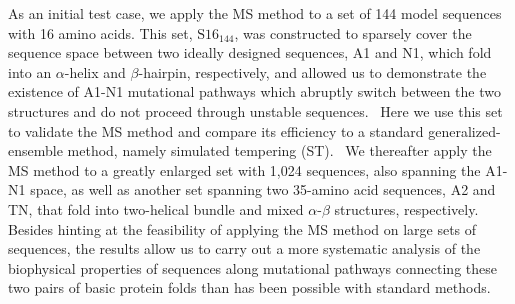 \documentclass[
aip,
rsi,%
amsmath,amssymb,
reprint,%
]{revtex4-1}
\newcommand {\SR}		{${\mathrm{S16}_{144}}$}
\begin{document}
As an initial test case, we apply the MS method to a set of 144 model sequences with 16 amino acids. This set, {\SR}, was constructed to sparsely cover the sequence space between two ideally designed sequences, A1 and N1, which fold into an $\alpha$-helix and $\beta$-hairpin, respectively, and allowed us to demonstrate the existence of A1-N1 mutational pathways which abruptly switch between the two structures and do not proceed through unstable sequences.~\cite{Holzgrafe2014} Here we use this set to validate the MS method and compare its efficiency to a standard generalized-ensemble method, namely simulated tempering (ST).~\cite{Marinari1992,Lyubartsev1992} We thereafter apply the MS method to a greatly enlarged set with 1,024 sequences, also spanning the A1-N1 space, as well as another set spanning two 35-amino acid sequences, A2 and TN, that fold into two-helical bundle and mixed $\alpha$-$\beta$ structures, respectively. Besides hinting at the feasibility of applying the MS method on large sets of sequences, the results allow us to carry out a more systematic analysis of the biophysical properties of sequences along mutational pathways connecting these two pairs of basic protein folds than has been possible with standard methods.~\cite{Holzgrafe2014,Holzgrafe2015} 






\end{document}
